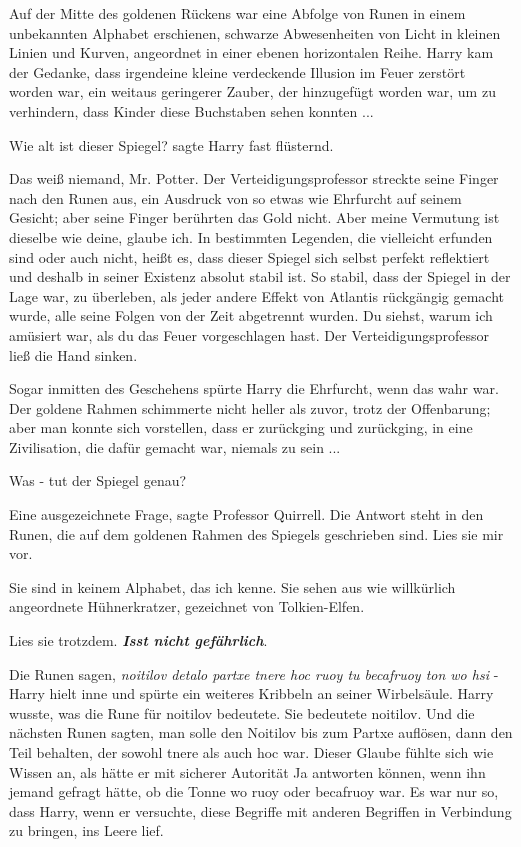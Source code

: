Auf der Mitte des goldenen Rückens war eine Abfolge von Runen in einem
unbekannten Alphabet erschienen, schwarze Abwesenheiten von Licht in kleinen
Linien und Kurven, angeordnet in einer ebenen horizontalen Reihe. Harry kam der
Gedanke, dass irgendeine kleine verdeckende Illusion im Feuer zerstört worden
war, ein weitaus geringerer Zauber, der hinzugefügt worden war, um zu
verhindern, dass Kinder diese Buchstaben sehen konnten ...

\glqq{}Wie alt ist dieser Spiegel?\grqq{} sagte Harry fast flüsternd.

\glqq{}Das weiß niemand, Mr. Potter.\grqq{} Der Verteidigungsprofessor streckte
seine Finger nach den Runen aus, ein Ausdruck von so etwas wie Ehrfurcht auf
seinem Gesicht; aber seine Finger berührten das Gold nicht. \glqq{}Aber meine
Vermutung ist dieselbe wie deine, glaube ich. In bestimmten Legenden, die
vielleicht erfunden sind oder auch nicht, heißt es, dass dieser Spiegel sich
selbst perfekt reflektiert und deshalb in seiner Existenz absolut stabil ist. So
stabil, dass der Spiegel in der Lage war, zu überleben, als jeder andere Effekt
von Atlantis rückgängig gemacht wurde, alle seine Folgen von der Zeit abgetrennt
wurden. Du siehst, warum ich amüsiert war, als du das Feuer vorgeschlagen
hast.\grqq{} Der Verteidigungsprofessor ließ die Hand sinken.

Sogar inmitten des Geschehens spürte Harry die Ehrfurcht, wenn das wahr war. Der
goldene Rahmen schimmerte nicht heller als zuvor, trotz der Offenbarung; aber
man konnte sich vorstellen, dass er zurückging und zurückging, in eine
Zivilisation, die dafür gemacht war, niemals zu sein ...

\glqq{}Was - tut der Spiegel genau?\grqq{}

\glqq{}Eine ausgezeichnete Frage\grqq{}, sagte Professor Quirrell. \glqq{}Die
Antwort steht in den Runen, die auf dem goldenen Rahmen des Spiegels geschrieben
sind. Lies sie mir vor.\grqq{}

\glqq{}Sie sind in keinem Alphabet, das ich kenne. Sie sehen aus wie willkürlich
angeordnete Hühnerkratzer, gezeichnet von Tolkien-Elfen.\grqq{}

\glqq{}Lies sie trotzdem.\textbf{\emph{ Isst nicht gefährlich}}.\grqq{}

\glqq{}Die Runen sagen, \emph{noitilov detalo partxe tnere hoc ruoy tu becafruoy
ton wo hsi} -\grqq{} Harry hielt inne und spürte ein weiteres Kribbeln an seiner
Wirbelsäule. Harry wusste, was die Rune für noitilov bedeutete. Sie bedeutete
noitilov. Und die nächsten Runen sagten, man solle den Noitilov bis zum Partxe
auflösen, dann den Teil behalten, der sowohl tnere als auch hoc war. Dieser
Glaube fühlte sich wie Wissen an, als hätte er mit sicherer Autorität \glqq{}
Ja\grqq{} antworten können, wenn ihn jemand gefragt hätte, ob die Tonne wo ruoy
oder becafruoy war. Es war nur so, dass Harry, wenn er versuchte, diese Begriffe
mit anderen Begriffen in Verbindung zu bringen, ins Leere lief.


